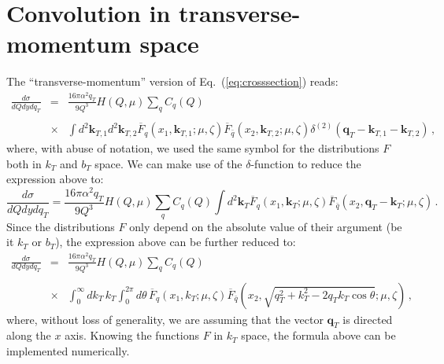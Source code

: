 \documentclass[10pt,a4paper]{article}
\begin{document}
\section{Convolution in transverse-momentum space}

The ``transverse-momentum'' version of Eq.~(\ref{eq:crosssection}) reads:
\begin{equation}\label{eq:crosssectionkt}
\begin{array}{rcl}
  \displaystyle \frac{d\sigma}{dQ dy dq_T} &=&\displaystyle 
  \frac{16\pi\alpha^2q_T}{9 Q^3} H(Q,\mu) \sum_q C_q(Q)\\
\\
&\times&\displaystyle 
  \int d^2\mathbf{k}_{T,1}d^2\mathbf{k}_{T,2}
  \overline{F}_q(x_1,\mathbf{k}_{T,1};\mu,\zeta)
  \overline{F}_{\bar{q}}(x_2,\mathbf{k}_{T,2};\mu,\zeta)\delta^{(2)}(\mathbf{q}_{T}-\mathbf{k}_{T,1}-\mathbf{k}_{T,2})\,,
\end{array}
\end{equation}
where, with abuse of notation, we used the same symbol for the
distributions $F$ both in $k_T$ and $b_T$ space. We can make use of
the $\delta$-function to reduce the expression above to:
\begin{equation}\label{eq:crosssectionkt2}
\frac{d\sigma}{dQ dy dq_T} =\frac{16\pi\alpha^2q_T}{9 Q^3} H(Q,\mu) \sum_q C_q(Q)\int d^2\mathbf{k}_{T}
  \overline{F}_q(x_1,\mathbf{k}_{T};\mu,\zeta)
  \overline{F}_{\bar{q}}(x_2,\mathbf{q}_{T}-\mathbf{k}_{T};\mu,\zeta)\,.
\end{equation}
Since the distributions $F$ only depend on the absolute value of their
argument (be it $k_T$ or $b_T$), the expression above can be further
reduced to:
\begin{equation}\label{eq:crosssectionkt3}
\begin{array}{rcl}
\displaystyle \frac{d\sigma}{dQ dy dq_T} &=&\displaystyle
                                             \frac{16\pi\alpha^2q_T}{9
                                             Q^3} H(Q,\mu) \sum_q
                                             C_q(Q)\\
\\
&\times&\displaystyle \int_0^\infty dk_{T}\,k_{T}\int_0^{2\pi}d\theta\,
  \overline{F}_q(x_1,k_T;\mu,\zeta)
  \overline{F}_{\bar{q}}(x_2,\sqrt{q_{T}^2+k_{T}^2
  -2q_{T}k_{T}\cos\theta};\mu,\zeta)\,,
\end{array}
\end{equation}
where, without loss of generality, we are assuming that the vector
$\mathbf{q}_T$ is directed along the $x$ axis. Knowing the functions
$F$ in $k_T$ space, the formula above can be implemented numerically.
\end{document}
